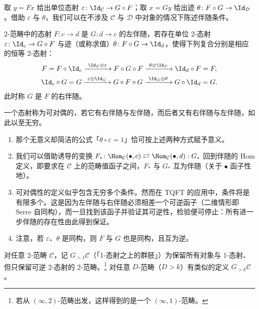 取 $y=Fx$ 给出单位态射 $\varepsilon\colon\Id_{\mathcal{C}}\to G\circ F$；取 $x=Gy$ 给出迹 $\theta\colon F\circ G\to\Id_{\mathcal{D}}$。借助 $\varepsilon$ 与 $\theta$，我们可以在不涉及 $\mathcal{C}$ 与 $\mathcal{D}$ 中对象的情况下陈述伴随条件。

\begin{definition}\label{def:3.4.7}
2-范畴中的态射 $F\colon c\to d$ 是 $G\colon d\to c$ 的左伴随，若存在单位 2-态射 $\varepsilon\colon\Id_c\to G\circ F$ 与迹（或称求值）$\theta\colon F\circ G\to\Id_d$，使得下列复合分别是相应的恒等 2-态射：
\begin{gather*}
F=F\circ\Id_c\xrightarrow{\ \Id_F\otimes\varepsilon\ }F\circ G\circ F\xrightarrow{\ \theta\otimes\Id_F\ }\Id_d\circ F=F,\\
\Id_c\circ G=G\xrightarrow{\ \varepsilon\otimes\Id_G\ }G\circ F\circ G\xrightarrow{\ \Id_G\otimes\theta\ }G\circ\Id_d=G.
\end{gather*}
此时称 $G$ 是 $F$ 的右伴随。
\end{definition}

一个态射称为可对偶的，若它有右伴随与左伴随，而后者又有右伴随与左伴随，如此以至无穷。

\begin{remark}\label{rem:3.4.8}
\begin{enumerate}[label=(\roman*),leftmargin=3em]
\item 那个无意义却简洁的公式「$\theta\circ\varepsilon=1$」恰可按上述两种方式赋予意义。
\item 我们可以借助诱导的变换 $F_*\colon\Hom_{\mathcal{C}}(\bullet,c)\rightleftarrows\Hom_{\mathcal{C}}(\bullet,d):G_*$ 回到伴随的 Hom 定义，即要求在 $\mathcal{C}$ 上的范畴值函子之间，$F_*$ 与 $G_*$ 互为伴随（关于 $\bullet$ 函子性地）。
\item 可对偶性的定义似乎包含无穷多个条件。然而在 TQFT 的应用中，条件将是有限多个。这是因为左伴随与右伴随必须相差一个可逆函子（二维情形即 Serre 自同构），而一旦找到该函子并验证其可逆性，检验便可停止：所有进一步伴随的存在性由此得到保证。
\item 注意，若 $\varepsilon$、$\theta$ 是同构，则 $F$ 与 $G$ 也是同构，且互为逆。
\end{enumerate}
\end{remark}

\begin{definition}\label{def:3.4.9}
对任意 2-范畴 $\mathcal{C}$，记 $G_{>1}\mathcal{C}$（「1-态射之上的群胚」）为保留所有对象与 1-态射、但只保留可逆 2-态射的 2-范畴。\footnote{若从 $(\infty,2)$-范畴出发，这样得到的是一个 $(\infty,1)$-范畴。} 对任意 $D$-范畴（$D>k$）有类似的定义 $G_{>k}\mathcal{C}$。
\end{definition}

